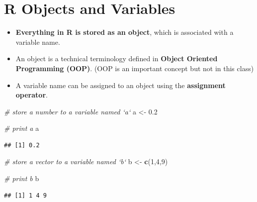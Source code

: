 \documentclass[]{book}
\newenvironment{Shaded}{\begin{snugshade}}{\end{snugshade}}
\newcommand{\KeywordTok}[1]{\textcolor[rgb]{0.13,0.29,0.53}{\textbf{{#1}}}}
\newcommand{\DecValTok}[1]{\textcolor[rgb]{0.00,0.00,0.81}{{#1}}}
\newcommand{\FloatTok}[1]{\textcolor[rgb]{0.00,0.00,0.81}{{#1}}}
\newcommand{\StringTok}[1]{\textcolor[rgb]{0.31,0.60,0.02}{{#1}}}
\newcommand{\CommentTok}[1]{\textcolor[rgb]{0.56,0.35,0.01}{\textit{{#1}}}}
\newcommand{\NormalTok}[1]{{#1}}
\providecommand{\tightlist}{%
  \setlength{\itemsep}{0pt}\setlength{\parskip}{0pt}}
\begin{document}
\section{R Objects and Variables}\label{r-objects-and-variables}

\begin{itemize}
\tightlist
\item
  \textbf{Everything in R is stored as an object}, which is associated
  with a variable name.
\item
  An object is a technical terminology defined in \textbf{Object
  Oriented Programming (OOP)}. (OOP is an important concept but not in
  this class)
\item
  A variable name can be assigned to an object using the
  \textbf{assignment operator}.
\end{itemize}

\begin{Shaded}
\begin{Highlighting}[]
\CommentTok{# store a number to a variable named `a`}
\NormalTok{a <-}\StringTok{ }\FloatTok{0.2}
\end{Highlighting}
\end{Shaded}

\begin{Shaded}
\begin{Highlighting}[]
\CommentTok{# print a}
\NormalTok{a}
\end{Highlighting}
\end{Shaded}

\begin{verbatim}
## [1] 0.2
\end{verbatim}

\begin{Shaded}
\begin{Highlighting}[]
\CommentTok{# store a vector to a variable named `b`}
\NormalTok{b <-}\StringTok{ }\KeywordTok{c}\NormalTok{(}\DecValTok{1}\NormalTok{,}\DecValTok{4}\NormalTok{,}\DecValTok{9}\NormalTok{)}
\end{Highlighting}
\end{Shaded}

\begin{Shaded}
\begin{Highlighting}[]
\CommentTok{# print b}
\NormalTok{b}
\end{Highlighting}
\end{Shaded}

\begin{verbatim}
## [1] 1 4 9
\end{verbatim}
\end{document}
